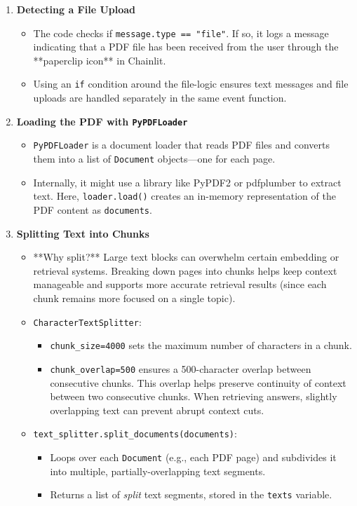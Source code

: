 \begin{enumerate}
    \item \textbf{Detecting a File Upload}
    \begin{itemize}
        \item The code checks if \texttt{message.type == "file"}. If so, it logs a message indicating that a PDF file has been received from the user through the **paperclip icon** in Chainlit.
        \item Using an \texttt{if} condition around the file-logic ensures text messages and file uploads are handled separately in the same event function.
    \end{itemize}

    \item \textbf{Loading the PDF with \texttt{PyPDFLoader}}
    \begin{itemize}
        \item \texttt{PyPDFLoader} is a document loader that reads PDF files and converts them into a list of \texttt{Document} objects—one for each page. 
        \item Internally, it might use a library like PyPDF2 or pdfplumber to extract text. Here, \texttt{loader.load()} creates an in-memory representation of the PDF content as \texttt{documents}.
    \end{itemize}

    \item \textbf{Splitting Text into Chunks}
    \begin{itemize}
        \item **Why split?** Large text blocks can overwhelm certain embedding or retrieval systems. Breaking down pages into chunks helps keep context manageable and supports more accurate retrieval results (since each chunk remains more focused on a single topic).
        \item \texttt{CharacterTextSplitter}:
        \begin{itemize}
          \item \texttt{chunk\_size=4000} sets the maximum number of characters in a chunk.
          \item \texttt{chunk\_overlap=500} ensures a 500-character overlap between consecutive chunks. This overlap helps preserve continuity of context between two consecutive chunks. When retrieving answers, slightly overlapping text can prevent abrupt context cuts.
        \end{itemize}
        \item \texttt{text\_splitter.split\_documents(documents)}:
        \begin{itemize}
            \item Loops over each \texttt{Document} (e.g., each PDF page) and subdivides it into multiple, partially-overlapping text segments.
            \item Returns a list of \textit{split} text segments, stored in the \texttt{texts} variable. 
        \end{itemize}
    \end{itemize}


\end{enumerate}
